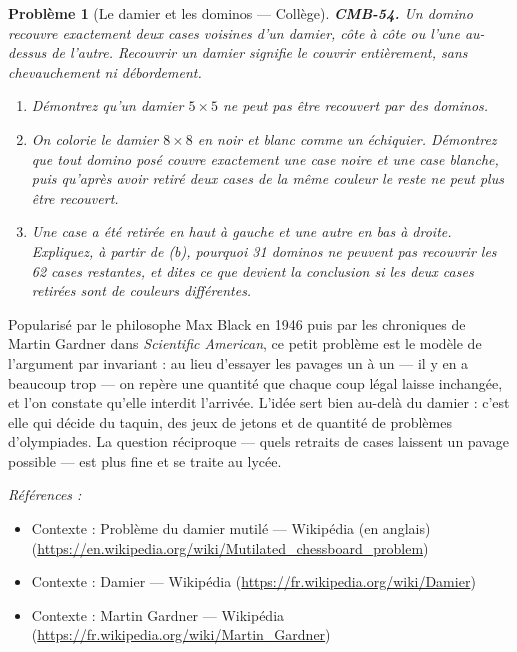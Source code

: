 \documentclass[11pt]{article}
\newtheorem{problem}{Problème}
\newenvironment{refs}{\par\small\noindent\emph{Références :}\begin{itemize}\setlength\itemsep{0pt}}{\end{itemize}\normalsize}
\begin{document}
\begin{problem}[{Le damier et les dominos --- Collège}]
\textbf{CMB-54.} Un domino recouvre exactement deux cases voisines d'un damier, côte à côte ou
l'une au-dessus de l'autre. Recouvrir un damier signifie le couvrir entièrement, sans chevauchement
ni débordement.
\begin{enumerate}
\item[(a)] Démontrez qu'un damier $ 5 \times 5 $ ne peut pas être recouvert par des dominos.
\item[(b)] On colorie le damier $ 8 \times 8 $ en noir et blanc comme un échiquier. Démontrez que tout
domino posé couvre exactement une case noire et une case blanche, puis qu'après avoir retiré deux
cases de la même couleur le reste ne peut plus être recouvert.
\item[(c)] Une case a été retirée en haut à gauche et une autre en bas à droite. Expliquez, à partir de
(b), pourquoi 31 dominos ne peuvent pas recouvrir les 62 cases restantes, et dites ce que devient
la conclusion si les deux cases retirées sont de couleurs différentes.
\end{enumerate}

\end{problem}

\noindent Popularisé par le philosophe Max Black en 1946 puis par les chroniques de Martin
Gardner dans \textit{Scientific American}, ce petit problème est le modèle de l'argument par
invariant : au lieu d'essayer les pavages un à un --- il y en a beaucoup trop --- on repère une
quantité que chaque coup légal laisse inchangée, et l'on constate qu'elle interdit l'arrivée.
L'idée sert bien au-delà du damier : c'est elle qui décide du taquin, des jeux de jetons et de
quantité de problèmes d'olympiades. La question réciproque --- quels retraits de cases laissent un
pavage possible --- est plus fine et se traite au lycée.

\begin{refs}
\item Contexte : Problème du damier mutilé --- Wikipédia (en anglais) (\url{https://en.wikipedia.org/wiki/Mutilated_chessboard_problem})
\item Contexte : Damier --- Wikipédia (\url{https://fr.wikipedia.org/wiki/Damier})
\item Contexte : Martin Gardner --- Wikipédia (\url{https://fr.wikipedia.org/wiki/Martin_Gardner})
\end{refs}

\bigskip
\end{document}
